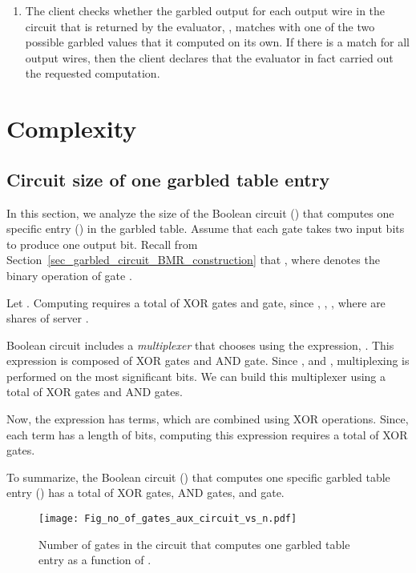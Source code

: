 \documentclass[10pt,journal,cspaper,compsoc]{IEEEtran}
\begin{document}
\begin{enumerate}
    \item{The client checks whether the garbled output for each output wire in the circuit that is returned by the evaluator, , matches with one of the two possible garbled values that it computed on its own. If there is a match for all output wires, then the client declares that the evaluator in fact carried out the requested computation.}

\end{enumerate}


 \section{Complexity}
\label{sec_complexity}
\subsection{Circuit size of one garbled table entry}

In this section, we analyze the size of the Boolean circuit () that computes one specific entry () in the garbled table. Assume that each gate takes two input bits to produce one output bit. Recall from Section~\ref{sec_garbled_circuit_BMR_construction} that , where  denotes the binary operation of gate .

Let . Computing  requires a total of  XOR gates and   gate, since , , , where  are shares of server .


Boolean circuit  includes a {\em multiplexer} that chooses  using the expression, . This expression is composed of  XOR gates and  AND gate. Since , and  , multiplexing is performed on the most significant  bits. We can build this multiplexer using a total of  XOR gates and  AND gates.


Now, the expression  has  terms, which are combined using  XOR operations. Since, each term has a length of  bits, computing this expression requires a total of  XOR gates.


To summarize, the Boolean circuit () that computes one specific garbled table entry () has a total of  XOR gates,  AND gates, and   gate.


\begin{figure}[t]
\centering
\texttt{[image: Fig\_no\_of\_gates\_aux\_circuit\_vs\_n.pdf]}
\vspace{-3 mm}
\caption{Number of gates in the circuit that computes one garbled table entry as a function of .\vspace{-4 mm}}
\label{fig_num_gates_aux_bool_circuit}
\end{figure}
\end{document}
